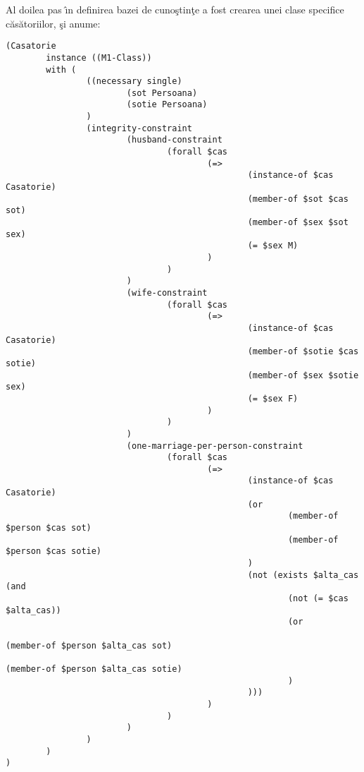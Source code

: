 \documentclass{article}
\begin{document}
Al doilea pas \^{\i}n definirea bazei de cuno\c{s}tin\c{t}e a fost crearea
unei clase specifice c\u{a}s\u{a}toriilor, \c{s}i anume:

{\scriptsize
\begin{verbatim}
(Casatorie
        instance ((M1-Class))
        with (
                ((necessary single)
                        (sot Persoana)
                        (sotie Persoana)
                )
                (integrity-constraint
                        (husband-constraint
                                (forall $cas
                                        (=>
                                                (instance-of $cas Casatorie)
                                                (member-of $sot $cas sot)
                                                (member-of $sex $sot sex)
                                                (= $sex M)
                                        )
                                )
                        )
                        (wife-constraint
                                (forall $cas
                                        (=>
                                                (instance-of $cas Casatorie)
                                                (member-of $sotie $cas sotie)
                                                (member-of $sex $sotie sex)
                                                (= $sex F)
                                        )
                                )
                        )
                        (one-marriage-per-person-constraint
                                (forall $cas
                                        (=>
                                                (instance-of $cas Casatorie)
                                                (or
                                                        (member-of $person $cas sot)
                                                        (member-of $person $cas sotie)
                                                )
                                                (not (exists $alta_cas (and
                                                        (not (= $cas $alta_cas))
                                                        (or
                                                                (member-of $person $alta_cas sot)
                                                                (member-of $person $alta_cas sotie)
                                                        )
                                                )))
                                        )
                                )
                        )
                )
        )
)
\end{verbatim}
}
\end{document}

